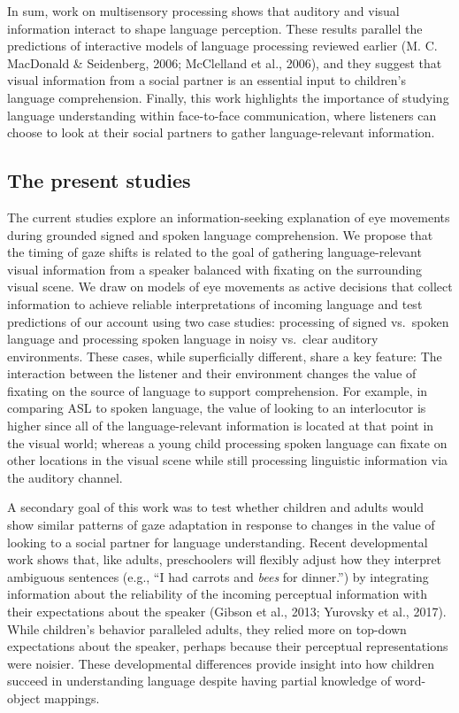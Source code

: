 \documentclass[oneside]{report}
\begin{document}
In sum, work on multisensory processing shows that auditory and visual
information interact to shape language perception. These results
parallel the predictions of interactive models of language processing
reviewed earlier (M. C. MacDonald \& Seidenberg, 2006; McClelland et
al., 2006), and they suggest that visual information from a social
partner is an essential input to children's language comprehension.
Finally, this work highlights the importance of studying language
understanding within face-to-face communication, where listeners can
choose to look at their social partners to gather language-relevant
information.

\subsection{The present studies}\label{the-present-studies}

The current studies explore an information-seeking explanation of eye
movements during grounded signed and spoken language comprehension. We
propose that the timing of gaze shifts is related to the goal of
gathering language-relevant visual information from a speaker balanced
with fixating on the surrounding visual scene. We draw on models of eye
movements as active decisions that collect information to achieve
reliable interpretations of incoming language and test predictions of
our account using two case studies: processing of signed vs.~spoken
language and processing spoken language in noisy vs.~clear auditory
environments. These cases, while superficially different, share a key
feature: The interaction between the listener and their environment
changes the value of fixating on the source of language to support
comprehension. For example, in comparing ASL to spoken language, the
value of looking to an interlocutor is higher since all of the
language-relevant information is located at that point in the visual
world; whereas a young child processing spoken language can fixate on
other locations in the visual scene while still processing linguistic
information via the auditory channel.

A secondary goal of this work was to test whether children and adults
would show similar patterns of gaze adaptation in response to changes in
the value of looking to a social partner for language understanding.
Recent developmental work shows that, like adults, preschoolers will
flexibly adjust how they interpret ambiguous sentences (e.g., ``I had
carrots and \emph{bees} for dinner.'') by integrating information about
the reliability of the incoming perceptual information with their
expectations about the speaker (Gibson et al., 2013; Yurovsky et al.,
2017). While children's behavior paralleled adults, they relied more on
top-down expectations about the speaker, perhaps because their
perceptual representations were noisier. These developmental differences
provide insight into how children succeed in understanding language
despite having partial knowledge of word-object mappings.
\end{document}
